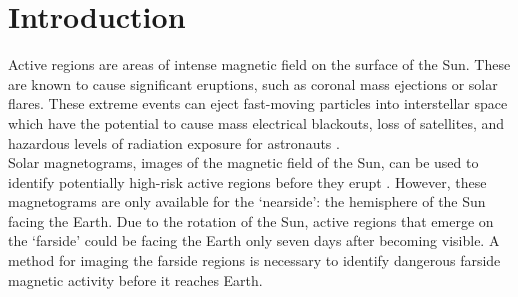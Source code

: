 \documentclass[11pt,a4paper,onecolumn]{report}
\begin{document}





\tableofcontents









%
%
%
%
\chapter{Introduction}
%
%
%
%

Active regions are areas of intense magnetic field on the surface of the Sun.
These are known to cause significant eruptions, such as coronal mass ejections
or solar flares. These extreme events can eject fast-moving particles into
interstellar space which have the potential to cause mass electrical blackouts,
loss of satellites, and hazardous levels of radiation exposure for astronauts
\citep{Mewaldt2005,council_severe_2008}. \\

Solar magnetograms, images of the magnetic field of the Sun, can be used to
identify potentially high-risk active regions before they erupt
\citep{bobra_solar_2015}. However, these magnetograms are only available for the
`nearside': the hemisphere of the Sun facing the Earth. Due to the rotation of
the Sun, active regions that emerge on the `farside' could be facing the Earth
only seven days after becoming visible. A method for imaging the farside
regions is necessary to identify dangerous farside magnetic activity before it
reaches Earth. \\
\end{document}
